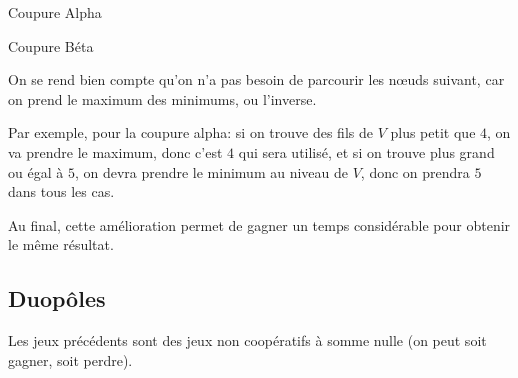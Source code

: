 \begin{minipage}{\textwidth}\begin{multicols}{2}\begin{center}

  Coupure Alpha


  Coupure Béta
\end{center}\end{multicols}\end{minipage}

On se rend bien compte qu'on n'a pas besoin de parcourir les nœuds suivant,
car on prend le maximum des minimums, ou l'inverse.

Par exemple, pour la coupure alpha: si on trouve des fils de $V$ plus petit
que $4$, on va prendre le maximum, donc c'est $4$ qui sera utilisé, et si on
trouve plus grand ou égal à $5$, on devra prendre le minimum au niveau de $V$,
donc on prendra $5$ dans tous les cas.

Au final, cette amélioration permet de gagner un temps considérable pour
obtenir le même résultat.


\subsection{Duopôles}
  Les jeux précédents sont des jeux non coopératifs à somme nulle (on peut soit
  gagner, soit perdre).

